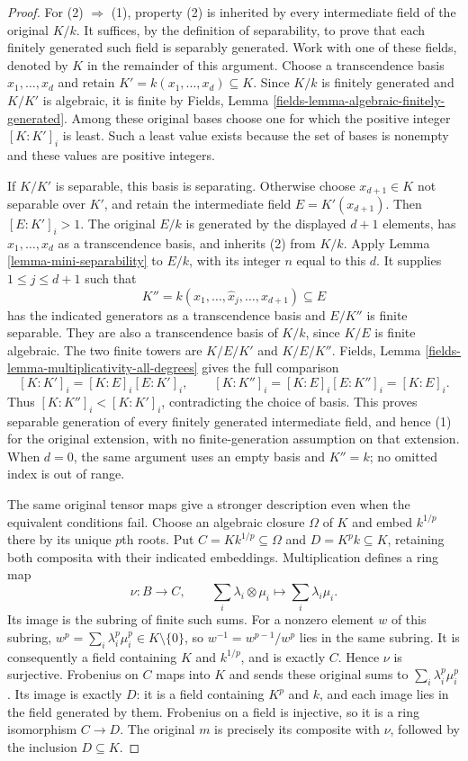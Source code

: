 \begin{proof}
For (2) $\Rightarrow$ (1), property (2) is inherited
by every intermediate field of the original $K/k$.
It suffices, by the definition of separability, to
prove that each finitely generated such field is
separably generated. Work with one of these fields,
denoted by $K$ in the remainder of this argument.
Choose a transcendence basis $x_1,\ldots,x_d$ and
retain $K'=k(x_1,\ldots,x_d)\subseteq K$. Since
$K/k$ is finitely generated and $K/K'$ is algebraic,
it is finite by Fields, Lemma
\ref{fields-lemma-algebraic-finitely-generated}.
Among these original bases choose one for which
the positive integer $[K:K']_i$ is least. Such a
least value exists because the set of bases is
nonempty and these values are positive integers.

If $K/K'$ is separable, this basis is separating.
Otherwise choose $x_{d+1}\in K$ not separable over
$K'$, and retain the intermediate field
$E=K'(x_{d+1})$. Then $[E:K']_i>1$.
The original $E/k$ is generated by the displayed
$d+1$ elements, has $x_1,\ldots,x_d$ as a
transcendence basis, and inherits (2) from $K/k$.
Apply Lemma \ref{lemma-mini-separability} to $E/k$,
with its integer $n$ equal to this $d$. It supplies
$1\leq j\leq d+1$ such that
$$
K''=k(x_1,\ldots,\widehat x_j,\ldots,x_{d+1})
\subseteq E
$$
has the indicated generators as a transcendence
basis and $E/K''$ is finite separable. They are
also a transcendence basis of $K/k$, since
$K/E$ is finite algebraic. The two finite towers
are $K/E/K'$ and $K/E/K''$. Fields, Lemma
\ref{fields-lemma-multiplicativity-all-degrees}
gives the full comparison
$$
[K:K']_i=[K:E]_i[E:K']_i,
\qquad
[K:K'']_i=[K:E]_i[E:K'']_i=[K:E]_i.
$$
Thus $[K:K'']_i<[K:K']_i$, contradicting the choice
of basis. This proves separable generation of
every finitely generated intermediate field, and
hence (1) for the original extension, with no
finite-generation assumption on that extension.
When $d=0$, the same argument uses an empty basis
and $K''=k$; no omitted index is out of range.

The same original tensor maps give a stronger
description even when the equivalent conditions
fail. Choose an algebraic closure $\Omega$ of $K$
and embed $k^{1/p}$ there by its unique $p$th roots.
Put $C=Kk^{1/p}\subseteq\Omega$ and
$D=K^p k\subseteq K$, retaining both composita
with their indicated embeddings. Multiplication
defines a ring map
$$
\nu:B\longrightarrow C,\qquad
\sum_i\lambda_i\otimes\mu_i\longmapsto
\sum_i\lambda_i\mu_i.
$$
Its image is the subring of finite such sums.
For a nonzero element $w$ of this subring,
$w^p=\sum_i\lambda_i^p\mu_i^p\in K\setminus\{0\}$,
so $w^{-1}=w^{p-1}/w^p$ lies in the same subring.
It is consequently a field containing $K$ and
$k^{1/p}$, and is exactly $C$. Hence $\nu$ is
surjective. Frobenius on $C$ maps into $K$ and
sends these original sums to $\sum_i\lambda_i^p\mu_i^p$.
Its image is exactly $D$: it is a field containing
$K^p$ and $k$, and each image lies in the field
generated by them. Frobenius on a field is injective,
so it is a ring isomorphism $C\longrightarrow D$.
The original $m$ is precisely its composite with
$\nu$, followed by the inclusion $D\subseteq K$.


\end{proof}
